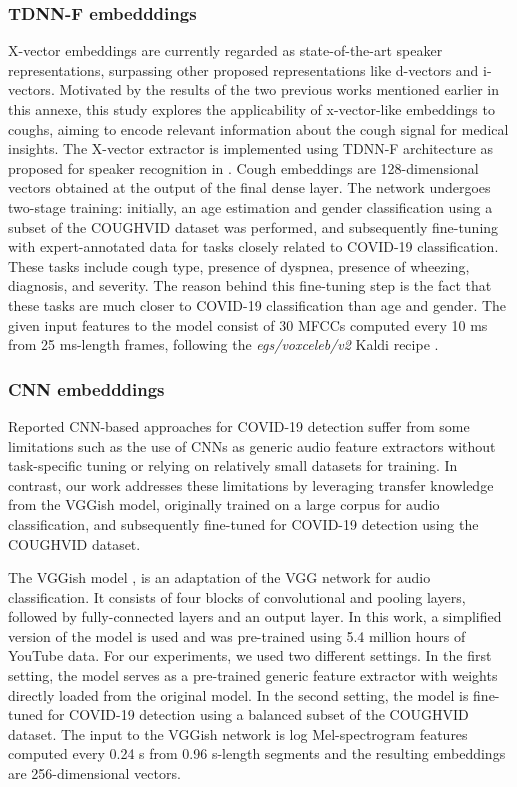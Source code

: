 \subsubsection{TDNN-F embedddings}
X-vector embeddings are currently regarded as state-of-the-art speaker representations, surpassing other proposed representations like d-vectors and i-vectors. Motivated by the results of the two previous works mentioned earlier in this annexe, this study explores the applicability of x-vector-like embeddings to coughs, aiming to encode relevant information about the cough signal for medical insights.
The X-vector extractor is implemented using \ac{TDNN-F} architecture as proposed for speaker recognition in \cite{villalbaSRE182020}. Cough embeddings are 128-dimensional vectors obtained at the output of the final dense layer. The network undergoes two-stage training: initially, an age estimation and gender classification using a subset of the COUGHVID dataset was performed, and subsequently fine-tuning with expert-annotated data for tasks closely related to COVID-19 classification. These tasks include cough type, presence of dyspnea, presence of wheezing, diagnosis, and severity. The reason behind this fine-tuning step is the fact that these tasks are much closer to COVID-19 classification than age and gender. The given input features to the model consist of 30 \acp{MFCC} computed every 10 ms from 25 ms-length frames, following the \textit{egs/voxceleb/v2} Kaldi recipe \cite{kaldi}.

\subsubsection{CNN embedddings}
Reported \ac{CNN}-based approaches for COVID-19 detection suffer from some limitations such as the use of \acp{CNN} as generic audio feature extractors without task-specific tuning or relying on relatively small datasets for training. In contrast, our work addresses these limitations by leveraging transfer knowledge from the VGGish model, originally trained on a large corpus for audio classification, and subsequently fine-tuned for COVID-19 detection using the COUGHVID dataset.

The VGGish model \cite{Hershey2017},  is an adaptation of the VGG network \cite{Simonyan2015} for audio classification. It consists of four blocks of convolutional and pooling layers, followed by fully-connected layers and an output layer. In this work, a simplified version of the model is used and was pre-trained using 5.4 million hours of YouTube data. For our experiments, we used two different settings. In the first setting, the model serves as a pre-trained generic feature extractor with weights directly loaded from the original model. In the second setting, the model is fine-tuned for COVID-19 detection using a balanced subset of the COUGHVID dataset. The input to the VGGish network is log Mel-spectrogram features computed every 0.24 s from 0.96 s-length segments and the resulting embeddings are 256-dimensional vectors.

